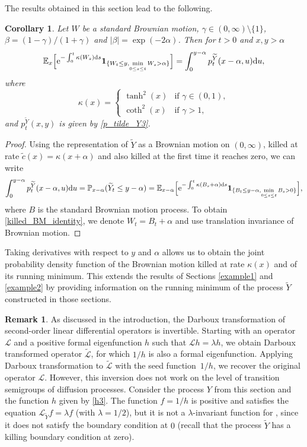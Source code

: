 \documentclass[pdftex]{sigma}
\numberwithin{equation}{section}
\newtheorem{Corollary}[Theorem]{Corollary}
\theoremstyle{definition}
\newtheorem{Remark}[Theorem]{Remark}
\def\L{{\mathcal L}}
\def\p{{\mathbb P}}
\def\e{{\mathbb E}}
\def\d{{\textnormal d}}
\begin{document}
The results obtained in this section lead to the following.

\begin{Corollary}
 Let $W$ be a standard Brownian motion, $\gamma \in (0,\infty) \setminus \{1\}$, $\beta=(1-\gamma)/(1+\gamma)$ and $|\beta|=\exp(-2 \alpha)$. Then for $t>0$ and $x,y>\alpha$
 \begin{equation}\label{killed_BM_identity}
 \e_x\Big[ {\rm e}^{-\int_0^t \kappa(W_s) \d s} {\mathbf 1}_{\{ W_t \le y, \min\limits_{0\le s \le t} W_s>\alpha\}}\Big]=\int_0^{y-\alpha} p_t^{\widetilde Y}(x-\alpha,u)\d u,
 \end{equation}
 where
 \[
\kappa(x)=
\begin{cases}
\tanh^2(x)  &\text{if }  \gamma \in (0,1),\\
\coth^2(x)  &\text{if }  \gamma>1,
\end{cases}
\]
and $p_t^{\widetilde Y}(x,y)$ is given by \eqref{p_tilde_Y3}.
\end{Corollary}
\begin{proof}
Using the representation of $\widetilde Y$ as a Brownian motion on $(0,\infty)$, killed at rate $\tilde c(x)=\kappa(x+\alpha)$ and also killed at the first time it reaches zero, we can write
\[
\int_0^{y-\alpha} p_t^{\widetilde Y}(x-\alpha,u)\d u=\p_{x-\alpha}(\widetilde Y_t \le y-\alpha)=\e_{x-\alpha}\Big[ {\rm e}^{-\int_0^t \kappa(B_s+\alpha) \d s} {\mathbf 1}_{\{ B_t \le y-\alpha, \min\limits_{0\le s \le t} B_s>0\}}\Big],
\]
where $B$ is the standard Brownian motion process. To obtain \eqref{killed_BM_identity}, we denote $W_t=B_t+\alpha$ and use translation invariance of Brownian motion.
\end{proof}

Taking derivatives with respect to $y$ and $\alpha$ allows us to obtain the joint probability density function of the Brownian motion killed at rate $\kappa(x)$ and of its running minimum. This extends the results of Sections \ref{example1} and \ref{example2} by providing information on the running minimum of the process $\widetilde Y$ constructed in those sections.

\begin{Remark}
As discussed in the introduction, the Darboux transformation of second-order linear differential operators is invertible. Starting with an operator $\L$ and a positive formal eigenfunction $h$ such that $\L h= \lambda h$, we obtain Darboux transformed operator $\widetilde \L$, for which $1/h$ is also a formal eigenfunction. Applying Darboux transformation to $\tilde \L$ with the seed function~$1/h$, we recover the original operator $\L$. However, this inversion does not work on the level of transition semigroups of diffusion processes. Consider the process $Y$ from this section and the function $h$ given by \eqref{h3}. The function $f=1/h$ is positive and satisfies the equation $\L_{\widetilde Y} f=\lambda f $ (with $\lambda=1/2$), but it is not a $\lambda$-invariant function for , since it does not satisfy the boundary condition at $0$ (recall that the process $\widetilde Y$ has a killing boundary condition at zero).
\end{Remark}
\end{document}
